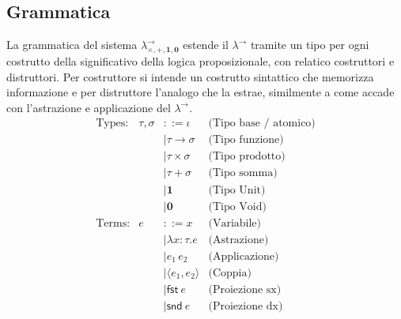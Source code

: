 \subsection{Grammatica}
La grammatica del sistema $\lambda^{\to}_{\times, +, \mathbf{1}, \mathbf{0}}$ estende il $\lambda^{\to}$ tramite un tipo per ogni costrutto della significativo
della logica proposizionale, con relatico costruttori e distruttori. Per costruttore si intende un costrutto sintattico che memorizza informazione e per distruttore
l'analogo che la estrae, similmente a come accade con l'astrazione e applicazione del $\lambda^{\to}$. 
\begin{equation}
    \begin{array}{lrll}
        \text{Types:}   & \tau, \sigma & ::= \iota                                      & \text{(Tipo base / atomico)}      \\
                        &              & \mid \tau \to \sigma                           & \text{(Tipo funzione)}            \\
                        &              & \mid \tau \times \sigma                        & \text{(Tipo prodotto)}            \\
                        &              & \mid \tau + \sigma                             & \text{(Tipo somma)}               \\
                        &              & \mid \mathbf{1}                                & \text{(Tipo Unit)}                \\
                        &              & \mid \mathbf{0}                                & \text{(Tipo Void)}                \\[6pt]
        \text{Terms:}   & e            & ::= x                                          & \text{(Variabile)}                \\
                        &              & \mid \lambda x : \tau . e                      & \text{(Astrazione)}               \\
                        &              & \mid e_1 \, e_2                                & \text{(Applicazione)}             \\
                        &              & \mid \langle e_1, e_2 \rangle                  & \text{(Coppia)}                   \\
                        &              & \mid \mathsf{fst} \ e                          & \text{(Proiezione sx)}            \\
                        &              & \mid \mathsf{snd} \ e                          & \text{(Proiezione dx)}            \\

\end{array}
\end{equation}
